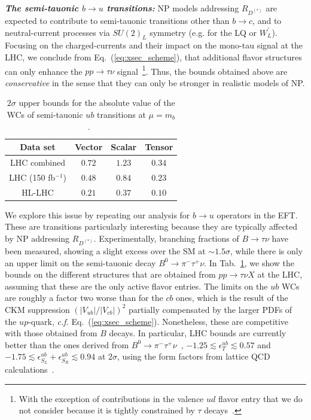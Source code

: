 \documentclass[%
 reprint,
 superscriptaddress,preprintnumbers,
 amsmath,amssymb,
 aps,
]{revtex4-1}
\begin{document}
\textit{\textbf{The semi-tauonic $b\to u$ transitions:}} NP models addressing $R_{D^{(*)}}$ are expected to contribute to semi-tauonic transitions other than $b\to c$, and to neutral-current processes via $SU(2)_L$ symmetry (e.g. for the LQ or $W^\prime_L$). Focusing on the charged-currents and their impact on the mono-tau signal at the LHC, we conclude from Eq.~(\ref{eq:xsec_scheme}), that additional flavor structures can only enhance the $p p \to \tau  \nu$ signal~\footnote{With the exception of contributions in the valence $ud$ flavor entry that we do not consider because it is tightly constrained by $\tau$ decays~\cite{Cirigliano:2018dyk}.}. Thus, the bounds obtained above are \textit{conservative} in the sense that they can only be stronger in realistic models of NP. 

\begin{table}[h]
\caption{$2\sigma$ upper bounds for the absolute value of the WCs of semi-tauonic $ub$ transitions at $\mu=m_b$.~\label{tab:fitsub}}
\begin{tabular}{cccc}
\hline\hline
Data set& Vector& Scalar & Tensor\\
\hline
LHC combined          & $0.72$ & $1.23$ & $0.34$\\
\hline
LHC (150 fb$^{-1}$)       &$0.48$ & $0.84$ & $0.23$\\
HL-LHC  & $0.21$ & $0.37$ & $0.10$\\
\hline\hline
\end{tabular}
\end{table}

We explore this issue by repeating our analysis for $b\to u$ operators in the EFT. These are transitions particularly interesting because they are typically affected by NP addressing $R_{D^{(*)}}$. Experimentally, branching fractions of $B\to \tau\nu$ have been measured, showing a slight excess over the SM at $\sim 1.5\sigma$, while there is only an upper limit on the semi-tauonic decay $B^0\to\pi^-\tau^+\nu$. In Tab.~\ref{tab:fitsub}, we show the bounds on the different structures that are obtained from $pp\to\tau\nu X$ at the LHC, assuming that these are the only active flavor entries. The limits on the $ub$ WCs are roughly a factor two worse than for the $cb$ ones, which is the result of the CKM suppression $(|V_{ub}|/|V_{cb}|)^2$ partially compensated by the larger PDFs of the $up$-quark, \textit{c.f.}  Eq.~(\ref{eq:xsec_scheme}). Nonetheless, these are competitive with those obtained from $B$ decays. {In particular, LHC bounds are currently better than the ones derived from $B^0\to\pi^-\tau^+\nu$~\cite{Hamer:2015jsa}, $-1.25\lesssim\epsilon_T^{ub}\lesssim0.57$ and  $-1.75\lesssim\epsilon_{S_L}^{ub}+\epsilon_{S_R}^{ub}\lesssim 0.94$ at 2$\sigma$, using the form factors from lattice QCD calculations~\cite{Lattice:2015tia,Bailey:2015nbd}.}  
\end{document}
